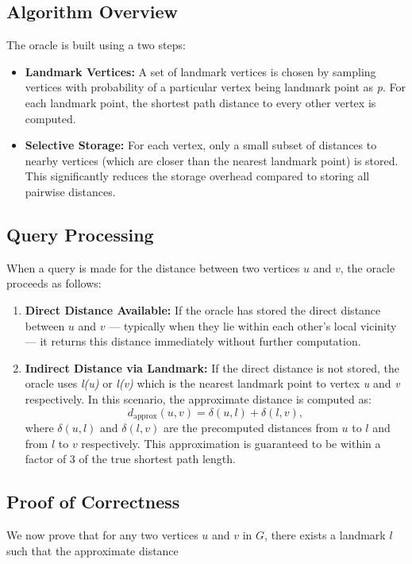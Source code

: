 \documentclass{article}
\begin{document}
\subsection{Algorithm Overview}
The oracle is built using a two steps:
\begin{itemize}
    \item \textbf{Landmark Vertices:} A set of landmark vertices is chosen by sampling vertices with probability of a particular vertex being landmark point as \textit{p}. For each landmark point, the shortest path distance to every other vertex is computed.
    \item \textbf{Selective Storage:} For each vertex, only a small subset of distances to nearby vertices (which are closer than the nearest landmark point) is stored. This significantly reduces the storage overhead compared to storing all pairwise distances.
\end{itemize}
\subsection{Query Processing}
When a query is made for the distance between two vertices \(u\) and \(v\), the oracle proceeds as follows:

\begin{enumerate}
    \item \textbf{Direct Distance Available:}  
    If the oracle has stored the direct distance between \(u\) and \(v\) — typically when they lie within each other’s local vicinity — it returns this distance immediately without further computation.
    \newline
    \item \textbf{Indirect Distance via Landmark:}  
    If the direct distance is not stored, the oracle uses \textit{l(u)} or \textit{l(v)} which is the nearest landmark point to vertex \textit{u} and \textit{v} respectively. In this scenario, the approximate distance is computed as:
    \[
    d_{\text{approx}}(u,v) = \delta(u,l) + \delta(l,v),
    \]
    where \(\delta(u,l)\) and \(\delta(l,v)\) are the precomputed distances from \(u\) to \(l\) and from \(l\) to \(v\) respectively. This approximation is guaranteed to be within a factor of 3 of the true shortest path length.
\end{enumerate}

\subsection{Proof of Correctness}
We now prove that for any two vertices \(u\) and \(v\) in \(G\), there exists a landmark \(l\) such that the approximate distance
\end{document}
